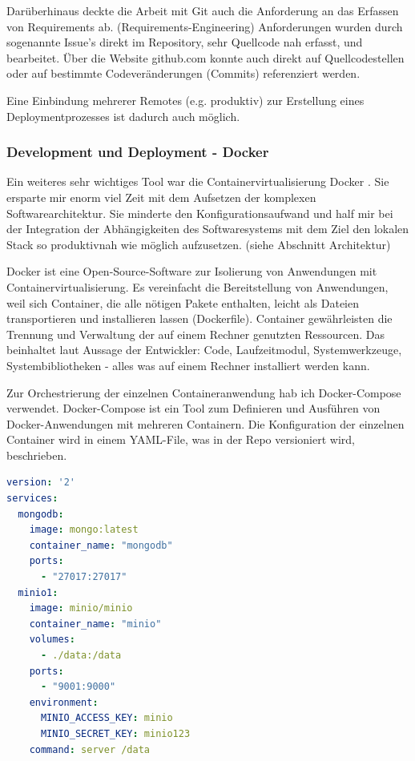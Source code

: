 \documentclass[12pt]{article}
\begin{document}
Darüberhinaus deckte die Arbeit mit Git auch die Anforderung an das Erfassen von Requirements ab. (Requirements-Engineering) Anforderungen wurden durch sogenannte Issue's direkt im Repository, sehr Quellcode nah erfasst, und bearbeitet. Über die Website github.com konnte auch direkt auf Quellcodestellen oder auf bestimmte Codeveränderungen (Commits) referenziert werden.

Eine Einbindung mehrerer Remotes (e.g. produktiv) zur Erstellung eines Deploymentprozesses ist dadurch auch möglich.




\subsubsection{Development und Deployment - Docker}

Ein weiteres sehr wichtiges Tool war die Containervirtualisierung Docker \cite{DOCKER}. Sie ersparte mir enorm viel Zeit mit dem Aufsetzen der komplexen Softwarearchitektur. Sie minderte den Konfigurationsaufwand und half mir bei der Integration der Abhängigkeiten des Softwaresystems mit dem Ziel den lokalen Stack so produktivnah wie möglich aufzusetzen. (siehe Abschnitt Architektur)

Docker ist eine Open-Source-Software zur Isolierung von Anwendungen mit Containervirtualisierung. Es vereinfacht die Bereitstellung von Anwendungen, weil sich Container, die alle nötigen Pakete enthalten, leicht als Dateien transportieren und installieren lassen (Dockerfile). Container gewährleisten die Trennung und Verwaltung der auf einem Rechner genutzten Ressourcen. Das beinhaltet laut Aussage der Entwickler: Code, Laufzeitmodul, Systemwerkzeuge, Systembibliotheken - alles was auf einem Rechner installiert werden kann.

Zur Orchestrierung der einzelnen Containeranwendung hab ich Docker-Compose verwendet. Docker-Compose ist ein Tool zum Definieren und Ausführen von Docker-Anwendungen mit mehreren Containern. Die Konfiguration der einzelnen Container wird in einem YAML-File, was in der Repo versioniert wird, beschrieben.

\bigbreak


\lstset{basicstyle=\ttfamily}
\lstset{xleftmargin=.2\textwidth, xrightmargin=.2\textwidth}
\begin{lstlisting}[language=yaml,frame=single]
version: '2'
services:
  mongodb:
    image: mongo:latest
    container_name: "mongodb"
    ports:
      - "27017:27017"
  minio1:
    image: minio/minio
    container_name: "minio"
    volumes:
      - ./data:/data
    ports:
      - "9001:9000"
    environment:
      MINIO_ACCESS_KEY: minio
      MINIO_SECRET_KEY: minio123
    command: server /data
\end{lstlisting}
\end{document}
